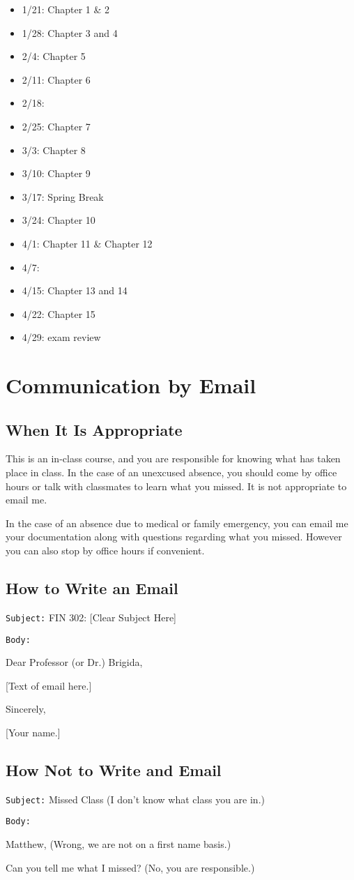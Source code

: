 \documentclass[11pt]{article}
\begin{document}
\begin{itemize}
\item 1/21: Chapter 1 \& 2
\item 1/28:  Chapter 3 and 4
\item 2/4: Chapter  5
\item 2/11: Chapter 6
\item 2/18:
\item 2/25: Chapter 7
\item 3/3: Chapter 8
\item 3/10: Chapter 9
\item 3/17: Spring Break
\item 3/24: Chapter 10
\item 4/1:  Chapter 11 \& Chapter 12
\item 4/7:
\item 4/15: Chapter 13 and 14
\item 4/22: Chapter 15
\item 4/29: exam review
\end{itemize}


\section{Communication by Email}
\label{sec:orgbe75a18}

\subsection{When It Is Appropriate}
\label{sec:org9115a9c}

This is an in-class course, and you are responsible for knowing what has taken place in class.  In the case of an unexcused absence, you should come by office hours or talk with classmates to learn what you missed. It is not appropriate to email me.

In the case of an absence due to medical or family emergency, you can email me your documentation along with questions regarding what you missed.  However you can also stop by office hours if convenient.

\subsection{How to Write an Email}
\label{sec:orgd94997c}

\texttt{Subject:} FIN 302: [Clear Subject Here]

\texttt{Body:}

Dear Professor (or Dr.) Brigida,

[Text of email here.]

Sincerely, 

[Your name.]

\subsection{How Not to Write and Email}
\label{sec:org623ff00}

\texttt{Subject:} Missed Class (I don't know what class you are in.)

\texttt{Body:}

Matthew, (Wrong, we are not on a first name basis.)

Can you tell me what I missed?  (No, you are responsible.)
\end{document}

